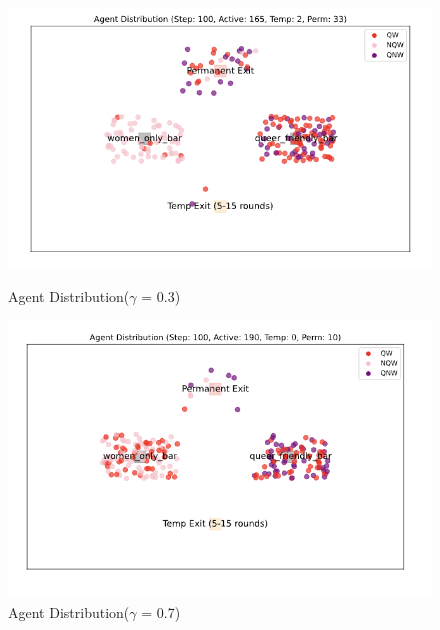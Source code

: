 \documentclass{article}
\begin{document}
\begin{figure}[H]
\centering
\begin{minipage}{0.48\textwidth}
  \centering
  \includegraphics[width=\linewidth]{figures/0.3 bar.png}
  \caption{Agent Distribution($\gamma$ = 0.3)}
\end{minipage}
\hfill
\begin{minipage}{0.48\textwidth}
  \centering
  \includegraphics[width=\linewidth]{figures/0.7 bar.png}
  \caption{Agent Distribution($\gamma$ = 0.7)}
\end{minipage}
\end{figure}
\end{document}
